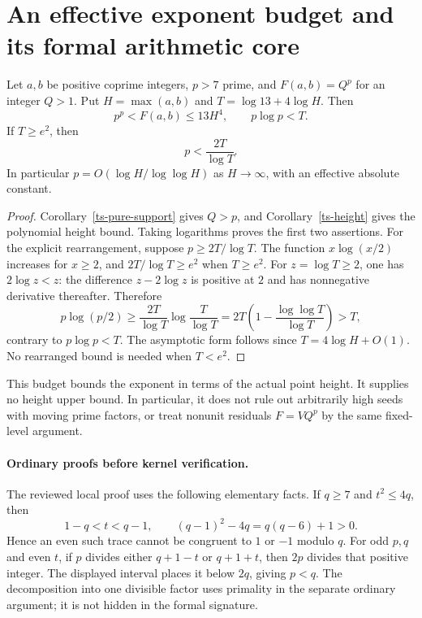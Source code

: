 \section{An effective exponent budget and its formal arithmetic core}
\label{hbc-section}

\begin{corollary}\label{hbc-budget}
Let $a,b$ be positive coprime integers, $p>7$ prime, and
$F(a,b)=Q^p$ for an integer $Q>1$. Put $H=\max(a,b)$ and
$T=\log13+4\log H$. Then
\[
 p^p<F(a,b)\le13H^4,\qquad p\log p<T.
\]
If $T\ge e^2$, then
\[
 p<\frac{2T}{\log T}.
\]
In particular $p=O(\log H/\log\log H)$ as $H\to\infty$,
with an effective absolute constant.
\end{corollary}
\begin{proof}
Corollary~\ref{ts-pure-support} gives $Q>p$, and
Corollary~\ref{ts-height} gives the polynomial height bound.
Taking logarithms proves the first two assertions.
For the explicit rearrangement, suppose $p\ge2T/\log T$.
The function $x\log(x/2)$ increases for $x\ge2$, and
$2T/\log T\ge e^2$ when $T\ge e^2$.
For $z=\log T\ge2$, one has $2\log z<z$: the difference
$z-2\log z$ is positive at $2$ and has nonnegative derivative
thereafter. Therefore
\[
 p\log(p/2)\ge\frac{2T}{\log T}\log\frac{T}{\log T}
   =2T\left(1-\frac{\log\log T}{\log T}\right)>T,
\]
contrary to $p\log p<T$. The asymptotic form follows since
$T=4\log H+O(1)$. No rearranged bound is needed when $T<e^2$.
\end{proof}

This budget bounds the exponent in terms of the actual point height.
It supplies no height upper bound. In particular, it does not rule out
arbitrarily high seeds with moving prime factors, or treat nonunit
residuals $F=VQ^p$ by the same fixed-level argument.

\paragraph{Ordinary proofs before kernel verification.}
The reviewed local proof uses the following elementary facts. If
$q\ge7$ and $t^2\le4q$, then
\[
 1-q<t<q-1,
 \qquad (q-1)^2-4q=q(q-6)+1>0.
\]
Hence an even such trace cannot be congruent to $1$ or $-1$
modulo $q$. For odd $p,q$ and even $t$, if $p$ divides either
$q+1-t$ or $q+1+t$, then $2p$ divides that positive integer.
The displayed interval places it below $2q$, giving $p<q$.
The decomposition into one divisible factor uses primality in the
separate ordinary argument; it is not hidden in the formal signature.

